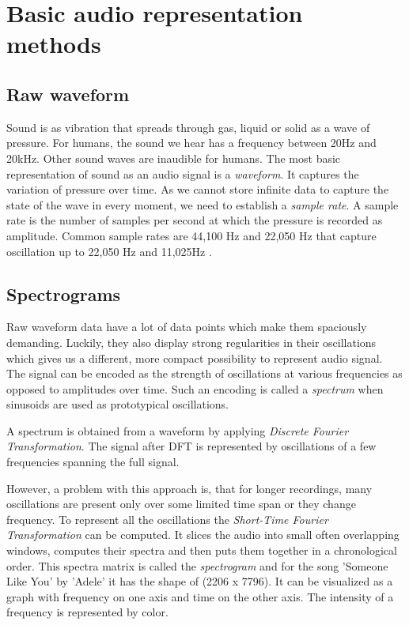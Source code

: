 \section{Basic audio representation methods}\label{sec:basic_music_representation_methods}
 

\subsection{Raw waveform}
Sound is as vibration that spreads through gas, liquid or solid as a wave of pressure. For humans, the sound we hear has a frequency between 20Hz and 20kHz. Other sound waves are inaudible for humans. The most basic representation of sound as an audio signal is a \textit{waveform}. It captures the variation of pressure over time. As we cannot store infinite data to capture the state of the wave in every moment, we need to establish a \textit{sample rate}. A sample rate is the number of samples per second at which the pressure is recorded as amplitude. Common sample rates are 44,100 Hz and 22,050 Hz that capture oscillation up to 22,050 Hz and 11,025Hz \cite{Schluter2017}.

\subsection{Spectrograms}\label{ssec:spectrogram_intro}
Raw waveform data have a lot of data points which make them spaciously demanding. Luckily, they also display strong regularities in their oscillations which gives us a different, more compact possibility to represent audio signal. The signal can be encoded as the strength of oscillations at various frequencies as opposed to amplitudes over time. Such an encoding is called a \textit{spectrum} when sinusoids are used as prototypical oscillations.

A spectrum is obtained from a waveform by applying \textit{Discrete Fourier Transformation}. The signal after DFT is represented by oscillations of a few frequencies spanning the full signal. 

However, a problem with this approach is, that for longer recordings, many oscillations are present only over some limited time span or they change frequency. To represent all the oscillations the \textit{Short-Time Fourier Transformation} can be computed. It slices the audio into small often overlapping windows, computes their spectra and then puts them together in a chronological order. This spectra matrix is called the \textit{spectrogram} and for the song 'Someone Like You' by 'Adele' it has the shape of (2206 x 7796). It can be visualized as a graph with frequency on one axis and time on the other axis. The intensity of a frequency is represented by color.


